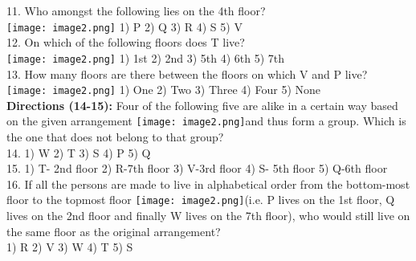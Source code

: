 \documentclass[
]{article}
\begin{document}
11. Who amongst the following lies on the 4th floor?\\
\texttt{[image: image2.png]}
1) P \hspace{2mm}2) Q \hspace{2mm}3) R \hspace{2mm}4) S \hspace{2mm}5) V\\

12. On which of the following floors does T live?\\
\texttt{[image: image2.png]}
1) 1st \hspace{2mm}2) 2nd \hspace{2mm}3) 5th \hspace{2mm}4) 6th \hspace{2mm}5) 7th\\

13. How many floors are there between the floors on which V and P live?\\
\texttt{[image: image2.png]}
1) One \hspace{2mm}2) Two \hspace{2mm}3) Three \hspace{2mm}4) Four \hspace{2mm}5) None\\

\textbf{Directions (14-15):} Four of the following five are alike in a certain way based on the given
arrangement \texttt{[image: image2.png]}and thus form a group. Which is the one that does not belong to that group?\\

14. 1) W \hspace{2mm}2) T \hspace{2mm}3) S \hspace{2mm}4) P \hspace{2mm}5) Q\\

15. 1) T- 2nd floor \hspace{2mm}2) R-7th floor \hspace{2mm}3) V-3rd floor \hspace{2mm}4) S- 5th floor \hspace{2mm}5) Q-6th floor\\

16. If all the persons are made to live in alphabetical order from the bottom-most floor to the
topmost floor \texttt{[image: image2.png]}(i.e. P lives on the 1st floor, Q lives on the 2nd floor and finally W lives on the 7th
floor), who would still live on the same floor as the original arrangement?\\
1) R \hspace{2mm}2) V \hspace{2mm}3) W \hspace{2mm}4) T \hspace{2mm}5) S\\
\end{document}

